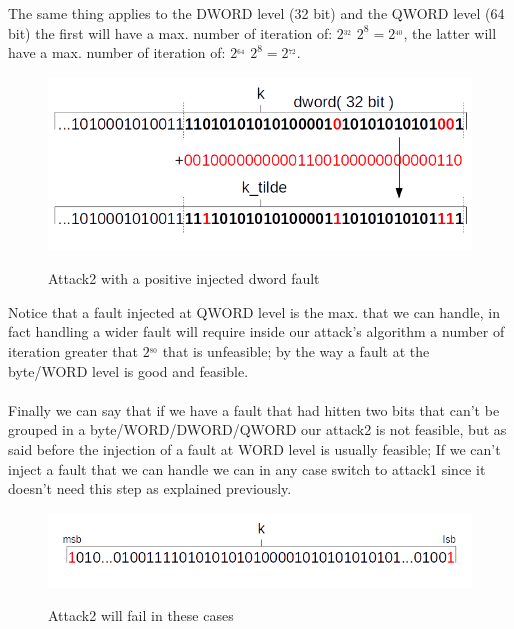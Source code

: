 \documentclass[11pt,english]{article}
\begin{document}
The same thing applies to the DWORD level (32 bit) and the QWORD level (64 bit) the first will have a max. number of iteration of: $2^_{32}$ \cdot $2^{8} = 2^_{40}$, the latter will have a max. number of iteration of: $2^_{64}$ \cdot $2^{8} = 2^_{72}$.

\begin{figure}[H]
\includegraphics[width=1.0\textwidth]{img/attack2dword.png} \\
\caption{\label{f_etichetta}Attack2 with a positive injected dword fault }
\end{figure}

Notice that a fault injected at QWORD level is the max. that we can handle, in fact handling a wider fault will require inside our attack's algorithm a number of iteration greater that $2^_{80}$ that is unfeasible; by the way a fault at the byte/WORD level is good and feasible.\\\\
Finally we can say that if we have a fault that had hitten two bits that can't be grouped in a byte/WORD/DWORD/QWORD our attack2 is not feasible, but as said before the injection of a fault at WORD level is usually feasible; If we can't inject a fault that we can handle we can in any case switch to attack1 since it doesn't need this step as explained previously.

\begin{figure}[H]
\includegraphics[width=1.0\textwidth]{img/attackfail.png} \\
\caption{\label{f_etichetta}Attack2 will fail in these cases }
\end{figure}
\end{document}
